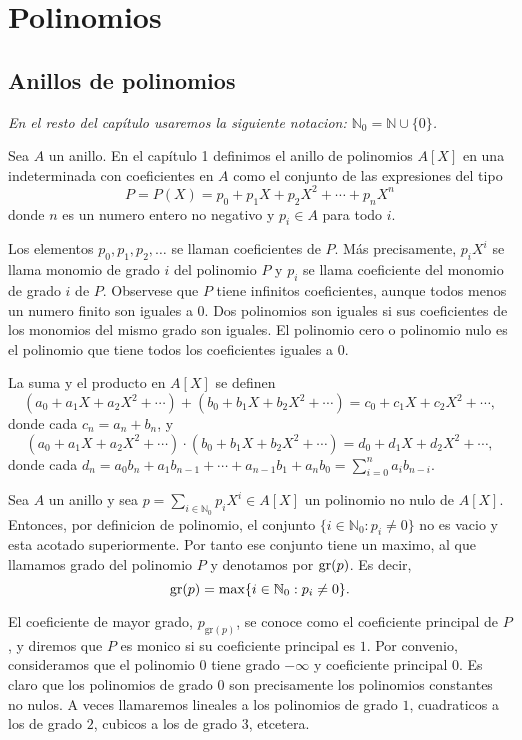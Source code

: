 \clearpage
\chapter{Polinomios}

\section{Anillos de polinomios}

\emph{En el resto del capítulo usaremos la siguiente notacion: \(\mathbb{N}_{0} = \mathbb{N}\cup \{0\}\).}

Sea \(A\) un anillo. En el capítulo 1 definimos el anillo de polinomios \(A[X]\) en una indeterminada con coeficientes en \(A\) como el conjunto de las expresiones del tipo
\[
P=P(X)=p_{0}+p_{1}X+p_{2}X^{2}+\cdots+p_{n}X^{n}
\]
donde \(n\) es un numero entero no negativo y \(p_{i}\in A\) para todo \(i\).

Los elementos \(p_{0},p_{1},p_{2},\ldots\) se llaman coeficientes de \(P\). Más precisamente, \(p_{i}X^{i}\) se llama monomio de grado \(i\) del polinomio \(P\) y \(p_{i}\) se llama coeficiente del monomio de grado \(i\) de \(P\). Observese que \(P\) tiene infinitos coeficientes, aunque todos menos un numero finito son iguales a \(0\). Dos polinomios son iguales si sus coeficientes de los monomios del mismo grado son iguales. El polinomio cero o polinomio nulo es el polinomio que tiene todos los coeficientes iguales a \(0\).

La suma y el producto en \(A[X]\) se definen
\[
(a_{0}+a_{1}X+a_{2}X^{2}+\cdots)+(b_{0}+b_{1}X+b_{2}X^{2}+\cdots)=c_{0}+c_{1}X+c _{2}X^{2}+\cdots,
\]
donde cada \(c_{n}=a_{n}+b_{n}\), y
\[
(a_{0}+a_{1}X+a_{2}X^{2}+\cdots)\cdot(b_{0}+b_{1}X+b_{2}X^{2}+\cdots)=d_{0}+d_{1 }X+d_{2}X^{2}+\cdots,
\]
donde cada \(d_{n}=a_{0}b_{n}+a_{1}b_{n-1}+\cdots+a_{n-1}b_{1}+a_{n}b_{0}=\sum_{i=0}^{n}a_{i} b_{n-i}\).

Sea \(A\) un anillo y sea \(p=\sum_{i\in\mathbb{N}_{0}}p_{i}X^{i}\in A[X]\) un polinomio no nulo de \(A[X]\). Entonces, por definicion de polinomio, el conjunto \(\{i\in\mathbb{N}_{0}:p_{i}\neq 0\}\) no es vacio y esta acotado superiormente. Por tanto ese conjunto tiene un maximo, al que llamamos grado del polinomio \(P\) y denotamos por \(\operatorname{gr}(p)\). Es decir,
\[
\operatorname{gr}(p)=\max\{i\in\mathbb{N}_{0}:p_{i}\neq 0\}.
\]

El coeficiente de mayor grado, \(p_{\textrm{gr}(p)}\), se conoce como el coeficiente principal de \(P\), y diremos que \(P\) es monico si su coeficiente principal es \(1\). Por convenio, consideramos que el polinomio \(0\) tiene grado \(-\infty\) y coeficiente principal \(0\). Es claro que los polinomios de grado \(0\) son precisamente los polinomios constantes no nulos. A veces llamaremos lineales a los polinomios de grado \(1\), cuadraticos a los de grado \(2\), cubicos a los de grado \(3\), etcetera.

